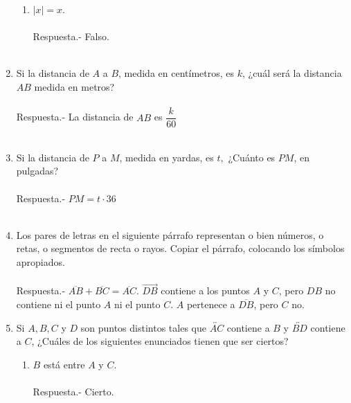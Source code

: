 \begin{enumerate}
\begin{enumerate}[\bfseries (a)]
\item $|x|=x$. \\\\
Respuesta.- \; Falso.\\\\
\end{enumerate}

\item Si la distancia de $A$ a $B$, medida en centímetros, es $k$, ¿cuál será la distancia $AB$ medida en metros?\\\\
Respuesta.- \; La distancia de $AB$ es $\dfrac{k}{60}$\\\\

\item Si la distancia de $P$ a $M$, medida en yardas, es $t,$ ¿Cuánto es $PM$, en pulgadas?\\\\
Respuesta.- \; $PM=t\cdot 36$\\\\

\item Los pares de letras en el siguiente párrafo representan o bien números, o retas, o segmentos de recta o rayos. Copiar el párrafo, colocando los símbolos apropiados.\\\\
Respuesta.- \; $\overline{AB}+\overline{BC}=\overline{AC}$.  $\overrightarrow{DB}$ contiene a los puntos $A$ y $C$,  pero $DB$ no contiene ni el punto $A$ ni el punto $C.$ $A$ pertenece a $\overline{DB}$, pero $C$ no.

\begin{center}
\end{center} 
\vspace{0.5cm}

\item Si $A,B,C$  y $D$ son puntos distintos tales que $\overleftrightarrow{AC}$ contiene a $B$ y $\overleftrightarrow{BD}$ contiene a $C$, ¿Cuáles de los siguientes enunciados tienen que ser ciertos?
\begin{enumerate}[\bfseries (a)]
\item $B$ está entre $A$ y $C$.\\\\
Respuesta.- \; Cierto.\\\\ 


\end{enumerate}
\end{enumerate}
